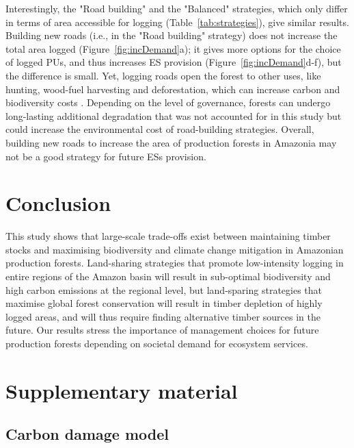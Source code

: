 \documentclass{article}
\begin{document}
Interestingly, the "Road building" and the "Balanced" strategies, which only differ in terms of area accessible for logging (Table~\ref{tab:strategies}), give similar results.
Building new roads (i.e., in the "Road building" strategy) does not increase the total area logged (Figure~\ref{fig:incDemand}a); it gives more options for the choice of logged PUs, and thus increases ES provision (Figure~\ref{fig:incDemand}d-f), but the difference is small. 
Yet, logging roads open the forest to other uses, like hunting, wood-fuel harvesting and deforestation, which can increase carbon and biodiversity costs \cite{Laurance2009a}. Depending on the level of governance, forests can undergo long-lasting additional degradation that was not accounted for in this study but could increase the environmental cost of road-building strategies. Overall, building new roads to increase the area of production forests in Amazonia may not be a good strategy for future ESs provision. 

\section{Conclusion}

This study shows that large-scale trade-offs exist between maintaining timber stocks and maximising biodiversity and climate change mitigation in Amazonian production forests. Land-sharing strategies that promote low-intensity logging in entire regions of the Amazon basin will result in sub-optimal biodiversity and high carbon emissions at the regional level, but land-sparing strategies that maximise global forest conservation will result in timber depletion of highly logged areas, and will thus require finding alternative timber sources in the future. Our results stress the importance of management choices for future production forests depending on societal demand for ecosystem services. 

\clearpage





\clearpage

\section{Supplementary material}

\subsection{Carbon damage model}
\label{supmat:cdam}
\end{document}
